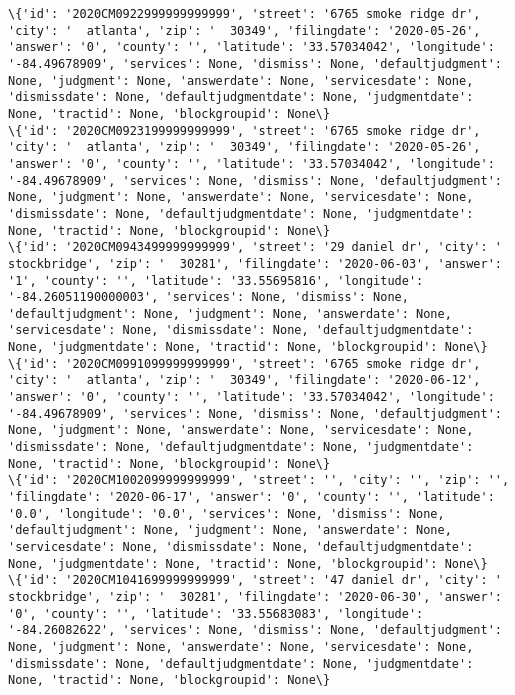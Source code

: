 \documentclass[11pt]{article}
\begin{document}
\begin{Verbatim}[commandchars=\\\{\}]
\{'id': '2020CM0922999999999999', 'street': '6765 smoke ridge dr', 'city': '  atlanta', 'zip': '  30349', 'filingdate': '2020-05-26', 'answer': '0', 'county': '', 'latitude': '33.57034042', 'longitude': '-84.49678909', 'services': None, 'dismiss': None, 'defaultjudgment': None, 'judgment': None, 'answerdate': None, 'servicesdate': None, 'dismissdate': None, 'defaultjudgmentdate': None, 'judgmentdate': None, 'tractid': None, 'blockgroupid': None\}
\{'id': '2020CM0923199999999999', 'street': '6765 smoke ridge dr', 'city': '  atlanta', 'zip': '  30349', 'filingdate': '2020-05-26', 'answer': '0', 'county': '', 'latitude': '33.57034042', 'longitude': '-84.49678909', 'services': None, 'dismiss': None, 'defaultjudgment': None, 'judgment': None, 'answerdate': None, 'servicesdate': None, 'dismissdate': None, 'defaultjudgmentdate': None, 'judgmentdate': None, 'tractid': None, 'blockgroupid': None\}
\{'id': '2020CM0943499999999999', 'street': '29 daniel dr', 'city': '  stockbridge', 'zip': '  30281', 'filingdate': '2020-06-03', 'answer': '1', 'county': '', 'latitude': '33.55695816', 'longitude': '-84.26051190000003', 'services': None, 'dismiss': None, 'defaultjudgment': None, 'judgment': None, 'answerdate': None, 'servicesdate': None, 'dismissdate': None, 'defaultjudgmentdate': None, 'judgmentdate': None, 'tractid': None, 'blockgroupid': None\}
\{'id': '2020CM0991099999999999', 'street': '6765 smoke ridge dr', 'city': '  atlanta', 'zip': '  30349', 'filingdate': '2020-06-12', 'answer': '0', 'county': '', 'latitude': '33.57034042', 'longitude': '-84.49678909', 'services': None, 'dismiss': None, 'defaultjudgment': None, 'judgment': None, 'answerdate': None, 'servicesdate': None, 'dismissdate': None, 'defaultjudgmentdate': None, 'judgmentdate': None, 'tractid': None, 'blockgroupid': None\}
\{'id': '2020CM1002099999999999', 'street': '', 'city': '', 'zip': '', 'filingdate': '2020-06-17', 'answer': '0', 'county': '', 'latitude': '0.0', 'longitude': '0.0', 'services': None, 'dismiss': None, 'defaultjudgment': None, 'judgment': None, 'answerdate': None, 'servicesdate': None, 'dismissdate': None, 'defaultjudgmentdate': None, 'judgmentdate': None, 'tractid': None, 'blockgroupid': None\}
\{'id': '2020CM1041699999999999', 'street': '47 daniel dr', 'city': '  stockbridge', 'zip': '  30281', 'filingdate': '2020-06-30', 'answer': '0', 'county': '', 'latitude': '33.55683083', 'longitude': '-84.26082622', 'services': None, 'dismiss': None, 'defaultjudgment': None, 'judgment': None, 'answerdate': None, 'servicesdate': None, 'dismissdate': None, 'defaultjudgmentdate': None, 'judgmentdate': None, 'tractid': None, 'blockgroupid': None\}

\end{Verbatim}
\end{document}
